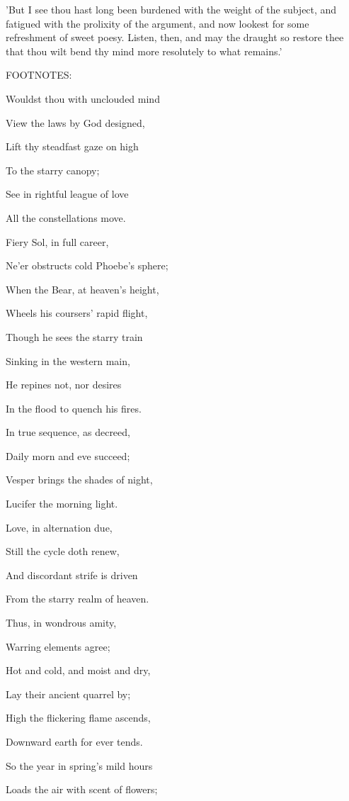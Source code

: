 'But I see thou hast long been burdened with the weight of the subject,
and fatigued with the prolixity of the argument, and now lookest for
some refreshment of sweet poesy. Listen, then, and may the draught so
restore thee that thou wilt bend thy mind more resolutely to what
remains.'

FOOTNOTES:


Wouldst thou with unclouded mind

View the laws by God designed,

Lift thy steadfast gaze on high

To the starry canopy;

See in rightful league of love

All the constellations move.

Fiery Sol, in full career,

Ne'er obstructs cold Phoebe's sphere;

When the Bear, at heaven's height,

Wheels his coursers' rapid flight,

Though he sees the starry train

Sinking in the western main,

He repines not, nor desires

In the flood to quench his fires.

In true sequence, as decreed,

Daily morn and eve succeed;

Vesper brings the shades of night,

Lucifer the morning light.

Love, in alternation due,

Still the cycle doth renew,

And discordant strife is driven

From the starry realm of heaven.

Thus, in wondrous amity,

Warring elements agree;

Hot and cold, and moist and dry,

Lay their ancient quarrel by;

High the flickering flame ascends,

Downward earth for ever tends.

So the year in spring's mild hours

Loads the air with scent of flowers;

